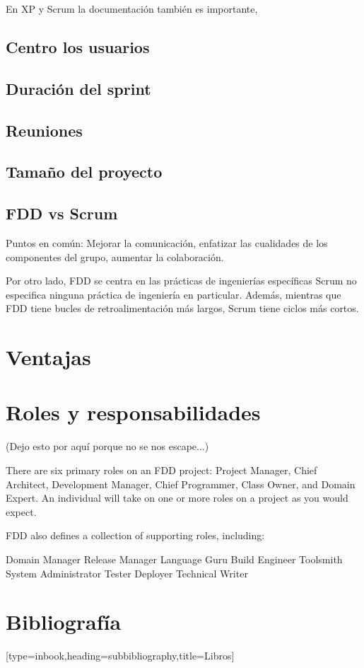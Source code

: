 \documentclass[11pt]{article}
\begin{document}
En XP y Scrum la documentación también es importante, 
\subsection*{Centro los usuarios}
\subsection*{Duración del sprint}
\subsection*{Reuniones}
\subsection*{Tamaño del proyecto}


\subsection*{FDD vs Scrum}
Puntos en común: Mejorar la comunicación, enfatizar las cualidades de los componentes del grupo, aumentar la colaboración.

Por otro lado, FDD se centra en las prácticas de ingenierías específicas Scrum no especifica ninguna práctica de ingeniería en particular. Además, mientras que FDD tiene bucles de retroalimentación más largos, Scrum tiene ciclos más cortos.

\section{Ventajas}

\section{Roles y responsabilidades}

(Dejo esto por aquí porque no se nos escape...)

There are six primary roles on an FDD project: Project Manager, Chief Architect, Development Manager, Chief Programmer, Class Owner, and Domain Expert. An individual will take on one or more roles on a project as you would expect.

FDD also defines a collection of supporting roles, including:

    Domain Manager
    Release Manager
    Language Guru
    Build Engineer
    Toolsmith
    System Administrator
    Tester
    Deployer
    Technical Writer


\newpage
\section{Bibliografía}
\nocite{*}


[type=inbook,heading=subbibliography,title={Libros}]
\end{document}
